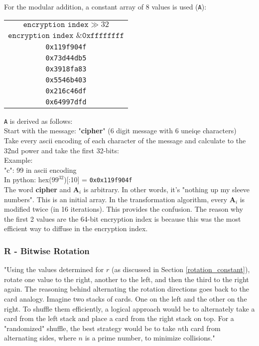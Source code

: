 \documentclass[fleqn, a4paper,12pt]{article}
\begin{document}
For the modular addition, a constant array of 8 values is used (\texttt{A}):

\begin{center}
	\begin{tabular}{c}
		$\texttt{encryption index} \gg 32$ \\
		$\texttt{encryption index \& 0xffffffff}$ \\
		\texttt{0x119f904f} \\
		\texttt{0x73d44db5} \\
		\texttt{0x3918fa83} \\
		\texttt{0x5546b403} \\
		\texttt{0x216c46df} \\
		\texttt{0x64997dfd} \\
	\end{tabular}
\end{center}

\texttt{A} is derived as follows:
\\
Start with the message: "\textbf{cipher}" (6 digit message with 6 uneiqe characters)
\\
Take every ascii encoding of each character of the message and calculate to the 32nd power and take the first 32-bits:
\\
Example:\\
"c": 99 in ascii encoding\\
In python: hex($99^{32}$)[:10] = \texttt{0x0x119f904f}
\\
The word \textbf{cipher} and $\textbf{A}_i$ is arbitrary. In other words, it's "nothing up my sleeve numbers". This is an initial array. In the transformation algorithm, every $\textbf{A}_i$ is modified twice (in 16 iterations). This provides the confusion. The reason why the first 2 values are the 64-bit encryption index is because this was the most efficient way to diffuse in the encryption index.

\subsubsection{R - Bitwise Rotation} %

"Using the values determined for $r$ (as discussed in Section \ref{rotation_constant}), rotate one value to the right, another to the left, and then the third to the right again. The reasoning behind alternating the rotation directions goes back to the card analogy. Imagine two stacks of cards. One on the left and the other on the right. To shuffle them efficiently, a logical approach would be to alternately take a card from the left stack and place a card from the right stack on top. For a "randomized" shuffle, the best strategy would be to take $n$th card from alternating sides, where $n$ is a prime number, to minimize collisions."
\end{document}
